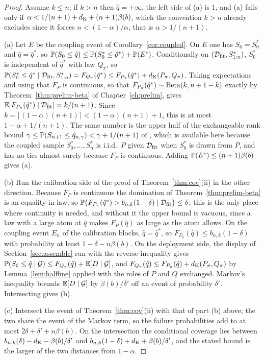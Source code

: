 \documentclass[../../../main.tex]{subfiles}
\begin{document}
\begin{proof}
Assume $k\le n$; if $k>n$ then $\hat q=+\infty$, the left side of (a) is $1$, and (a) fails only if $\alpha<1/(n+1)+d_{\mathrm{K}}+(n+1)\beta(b)$, which the convention $k>n$ already excludes since it forces $n<(1-\alpha)/\alpha$, that is $\alpha>1/(n+1)$.

(a) Let $E$ be the coupling event of Corollary~\ref{cor:coupled}. On $E$ one has $S_0=S^*_0$ and $\hat q=\hat q^*$, so $\mathbb{P}(S_0\le\hat q)\le\mathbb{P}(S^*_0\le\hat q^*)+\mathbb{P}(E^c)$. Conditionally on $(\mathcal D_{\mathrm{fit}},S^*_{1:n})$, $S^*_0$ is independent of $\hat q^*$ with law $Q_\pi$, so $\mathbb{P}(S^*_0\le\hat q^*\mid\mathcal D_{\mathrm{fit}},S^*_{1:n})=F_{Q_\pi}(\hat q^*)\le F_{P_\pi}(\hat q^*)+d_{\mathrm{K}}(P_\pi,Q_\pi)$. Taking expectations and using that $F_P$ is continuous, so that $F_{P_\pi}(\hat q^*)\sim\operatorname{Beta}(k,n+1-k)$ exactly by Theorem~\ref{thm:prelim-beta} of Chapter~\ref{ch:prelim}, gives $\mathbb{E}[F_{P_\pi}(\hat q^*)\mid\mathcal D_{\mathrm{fit}}]=k/(n+1)$. Since $k=\lceil(1-\alpha)(n+1)\rceil<(1-\alpha)(n+1)+1$, this is at most $1-\alpha+1/(n+1)$. The same number is the upper half of the exchangeable rank bound $\gamma\le\mathbb{P}(S_{n+1}\le\hat q_{n,\gamma})<\gamma+1/(n+1)$ of \citep[Thm.~1]{ramos2026}, which is available here because the coupled sample $S^*_0,\dots,S^*_n$ is i.i.d.\ $P$ given $\mathcal D_{\mathrm{fit}}$ when $S^*_0$ is drawn from $P$, and has no ties almost surely because $F_P$ is continuous. Adding $\mathbb{P}(E^c)\le(n+1)\beta(b)$ gives (a).

(b) Run the calibration side of the proof of Theorem~\ref{thm:cov}(ii) in the other direction. Because $F_P$ is continuous the domination of Theorem~\ref{thm:prelim-beta} is an equality in law, so $\mathbb{P}\big(F_{P_\pi}(\hat q^*)>b_{n,k}(1-\delta)\mid\mathcal D_{\mathrm{fit}}\big)\le\delta$; this is the only place where continuity is needed, and without it the upper bound is vacuous, since a law with a large atom at $\hat q$ makes $F_P(\hat q)$ as large as the atom allows. On the coupling event $E_n$ of the calibration blocks, $\hat q=\hat q^*$, so $F_{P_\pi}(\hat q)\le b_{n,k}(1-\delta)$ with probability at least $1-\delta-n\beta(b)$. On the deployment side, the display of Section~\ref{sec:assemble} run with the reverse inequality gives $\mathbb{P}(S_0\le\hat q\mid\mathcal G)\le F_{Q_\pi}(\hat q)+\mathbb{E}[D\mid\mathcal G]$, and $F_{Q_\pi}(\hat q)\le F_{P_\pi}(\hat q)+d_{\mathrm{K}}(P_\pi,Q_\pi)$ by Lemma~\ref{lem:halfline} applied with the roles of $P$ and $Q$ exchanged. Markov's inequality bounds $\mathbb{E}[D\mid\mathcal G]$ by $\beta(b)/\delta'$ off an event of probability $\delta'$. Intersecting gives (b).

(c) Intersect the event of Theorem~\ref{thm:cov}(ii) with that of part (b) above; the two share the event of the Markov term, so the failure probabilities add to at most $2\delta+\delta'+n\beta(b)$. On the intersection the conditional coverage lies between $b_{n,k}(\delta)-d_{\mathrm{K}}-\beta(b)/\delta'$ and $b_{n,k}(1-\delta)+d_{\mathrm{K}}+\beta(b)/\delta'$, and the stated bound is the larger of the two distances from $1-\alpha$.
\end{proof}
\end{document}
